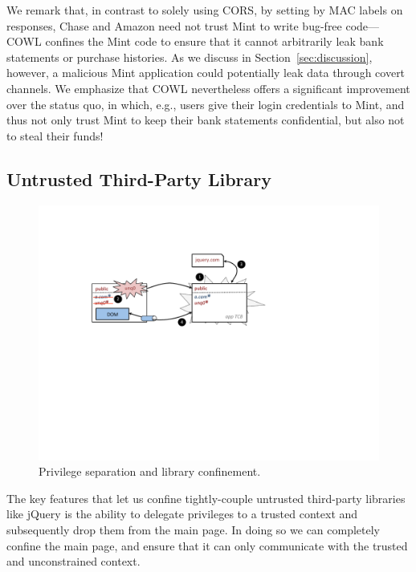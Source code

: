 We remark that, in contrast to solely using CORS, by setting by MAC
labels on responses, Chase and Amazon need not trust Mint to write
bug-free code---COWL confines the Mint code to ensure that it cannot
arbitrarily leak bank statements or purchase histories. As we discuss
in Section~\ref{sec:discussion}, however, a malicious Mint application
could potentially leak data through covert channels.  We emphasize
that COWL nevertheless offers a significant improvement over the
status quo, in which, e.g., users give their login credentials to
Mint, and thus not only trust Mint to keep their bank statements
confidential, but also not to steal their funds!

\subsection{Untrusted Third-Party Library}
\label{sec:apps-third-party}

\begin{figure}
\centerline{\includegraphics[width=\columnwidth]{jquery}}
\caption{\label{fig:jquery} Privilege separation and library
confinement.}
\end{figure}

The key features that let us confine tightly-couple untrusted
third-party libraries like jQuery is the ability to delegate
privileges to a trusted context and subsequently drop them from the
main page. In doing so we can completely confine the main page, and
ensure that it can only communicate with the trusted and unconstrained
context.

